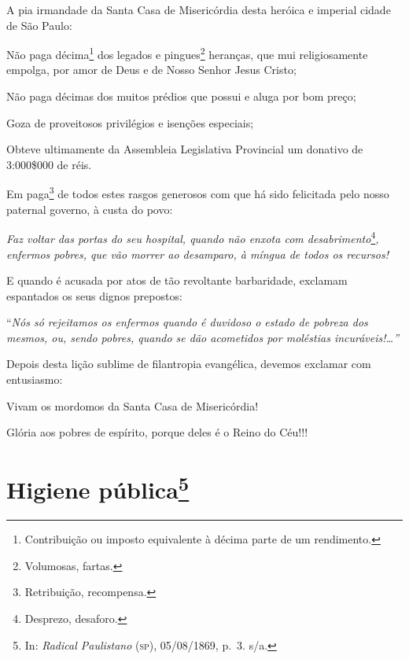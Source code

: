 A pia irmandade da Santa Casa de Misericórdia desta heróica e imperial
cidade de São Paulo:

Não paga décima\footnote{Contribuição ou imposto equivalente à décima
  parte de um rendimento.} dos legados e pingues\footnote{Volumosas,
  fartas.} heranças, que mui religiosamente empolga, por amor de Deus e
de Nosso Senhor Jesus Cristo;

Não paga décimas dos muitos prédios que possui e aluga por bom preço;

Goza de proveitosos privilégios e isenções especiais;

Obteve ultimamente da Assembleia Legislativa Provincial um donativo de
3:000\$000 de réis.

Em paga\footnote{Retribuição, recompensa.} de todos estes rasgos
generosos com que há sido felicitada pelo nosso paternal governo, à
custa do povo:

\emph{Faz voltar das portas do seu hospital, quando não enxota com
desabrimento}\footnote{Desprezo, desaforo.}\emph{,} \emph{enfermos
pobres, que vão morrer ao desamparo, à míngua de todos os recursos!}

E quando é acusada por atos de tão revoltante barbaridade, exclamam
espantados os seus dignos prepostos:

``\emph{Nós só rejeitamos os enfermos quando é duvidoso o estado de
pobreza dos mesmos, ou, sendo pobres, quando se dão acometidos por
moléstias incuráveis!\ldots{}''}

Depois desta lição sublime de filantropia evangélica, devemos exclamar
com entusiasmo:

Vivam os mordomos da Santa Casa de Misericórdia!

Glória aos pobres de espírito, porque deles é o Reino do Céu!!!

\chapter{Higiene pública\footnote{In: \emph{Radical Paulistano} (\textsc{sp}),
  05/08/1869, p.~3. s/a.}}

